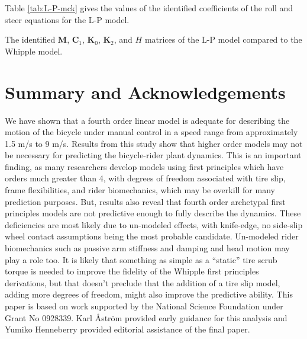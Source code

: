 \documentclass[a4paper]{article}
\begin{document}
Table \ref{tab:L-P-mck} gives the values of the identified coefficients of the
roll and steer equations for the L-P model.

\begin{table}
  \label{tab:L-P-mck}
  \centering
  \caption{The identified $\mathbf{M}$, $\mathbf{C}_1$, $\mathbf{K}_0$,
    $\mathbf{K}_2$, and $H$ matrices of the L-P model compared to the  Whipple
    model.}
  \small
  
\end{table}

\section*{Summary and Acknowledgements}

We have shown that a fourth order linear model is adequate for describing the
motion of the bicycle under manual control in a speed range from approximately
1.5 m/s to 9 m/s. Results from this study show that higher order models may
not be necessary for predicting the bicycle-rider plant dynamics. This is an
important finding, as many researchers develop models using first principles
which have orders much greater than 4, with degrees of freedom associated with
tire slip, frame flexibilities, and rider biomechanics, which may be overkill
for many prediction purposes. But, results also reveal that fourth order
archetypal first principles models are not predictive enough to fully describe
the dynamics. These deficiencies are most likely due to un-modeled effects,
with knife-edge, no side-slip wheel contact assumptions being the most probable
candidate. Un-modeled rider biomechanics such as passive arm stiffness and
damping and head motion may play a role too. It is likely that something as
simple as a ``static'' tire scrub torque is needed to improve the fidelity of
the Whipple first principles derivations, but that doesn't preclude that the
addition of a tire slip model, adding more degrees of freedom, might also
improve the predictive ability. This paper is based on work supported by the
National Science Foundation under Grant No 0928339. Karl {\AA}str{\"o}m
provided early guidance for this analysis and Yumiko Henneberry provided
editorial assistance of the final paper.



\end{document}
